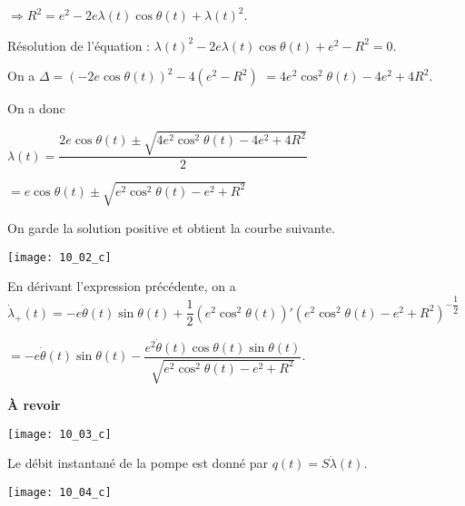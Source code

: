 $\Rightarrow R^2 =e^2 -2e\lambda(t)\cos\theta(t)+\lambda(t)^2$.

Résolution de l'équation :
$\lambda(t)^2-2e\lambda(t)\cos\theta(t)+e^2 -R^2=0$.

On  a $\Delta = \left(-2e\cos\theta(t)\right)^2-4\left(e^2 -R^2\right)$
$ =4e^2\cos^2\theta(t)-4e^2+4R^2$.

On a donc 

$ \lambda(t)= \dfrac{2e\cos\theta(t)\pm \sqrt{4e^2\cos^2\theta(t)-4e^2+4R^2}}{2}$

$  =e\cos\theta(t)\pm \sqrt{e^2\cos^2\theta(t)-e^2+R^2}$


On garde la solution positive et obtient la courbe suivante.

\begin{center}
\texttt{[image: 10\_02\_c]}
\end{center}

\ifprof
\else
\fi


En dérivant l'expression précédente, on a 
$ \dot{\lambda}_{+}(t)= -e\dot{\theta}(t)\sin\theta(t)+  \dfrac{1}{2}\left( e^2\cos^2\theta(t)\right)'\left( e^2\cos^2\theta(t)-e^2+R^2\right)^{-\dfrac{1}{2}} $

$= -e\dot{\theta}(t)\sin\theta(t)-  \dfrac{ e^2\dot{\theta}(t)\cos\theta(t)\sin\theta(t)}{ \sqrt{e^2\cos^2\theta(t)-e^2+R^2}}$.

 \textbf{À revoir}
\begin{center}
\texttt{[image: 10\_03\_c]}
\end{center}

\else
\fi


\ifprof
Le débit instantané de la pompe est donné par $q(t)=S\dot{\lambda}(t)$.
\else
\fi



\ifprof
\begin{center}
\texttt{[image: 10\_04\_c]}
\end{center}
\else
\fi

